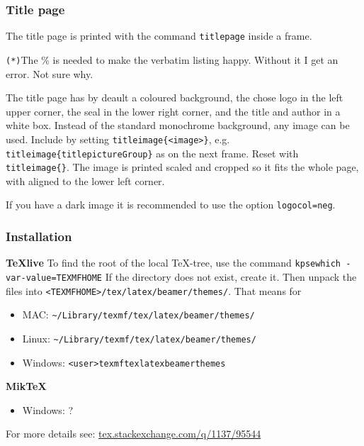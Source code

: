 \documentclass[aspectratio=1610]{beamer}
\def\txtbs{\symbol{92}}
\begin{document}
\begin{frame}[fragile]
  \frametitle{Title page}
  The title page is printed with the command \texttt{\txtbs titlepage} inside a frame.
\begin{CodeBox}{}
\begin{frame}[plain]%
  \titlepage
\end{frame}%
\end{CodeBox}
\verb|(*)|{\footnotesize The \% is needed to make the verbatim listing happy. Without it I get an error. Not sure why.}

\strut\par

The title page has by deault a coloured background, the chose logo in the left upper corner, the seal in the lower right corner, and the title and author in a white box. Instead of the standard monochrome background, any image can be used. Include by setting \texttt{\txtbs titleimage\{<image>\}}, e.g. \texttt{\txtbs titleimage\{titlepictureGroup\}} as on the next frame. Reset with \texttt{\txtbs titleimage\{\}}. The image is printed scaled and cropped so it fits the whole page, with aligned to the lower left corner.
\par\strut\par
If you have a dark image it is recommended to use the option \texttt{logocol=neg}. 
\end{frame}

\begin{frame}[plain]
  \titlepage
\end{frame}
\titleimage{}

\begin{frame}%
  \frametitle{Installation}
  \textbf{TeXlive}\newline
  To find the root of the local TeX-tree, use the command\newline
  \texttt{kpsewhich -var-value=TEXMFHOME}\newline
  If the directory does not exist, create it. Then unpack the files into \texttt{<TEXMFHOME>/tex/latex/beamer/themes/}. That means for 
  \begin{itemize}
  \item MAC: \texttt{\~{}/Library/texmf/tex/latex/beamer/themes/}
  \item Linux: \texttt{\~{}/Library/texmf/tex/latex/beamer/themes/}
  \item Windows: \texttt{<user>\txtbs texmf\txtbs tex\txtbs latex\txtbs beamer\txtbs themes\txtbs}
  \end{itemize}
  \textbf{MikTeX}
  \begin{itemize}
  \item Windows: ?
  \end{itemize}
  \par\strut\par
  For more details see: \href{https://tex.stackexchange.com/q/1137/95544}{tex.stackexchange.com/q/1137/95544}
\end{frame}
\end{document}
